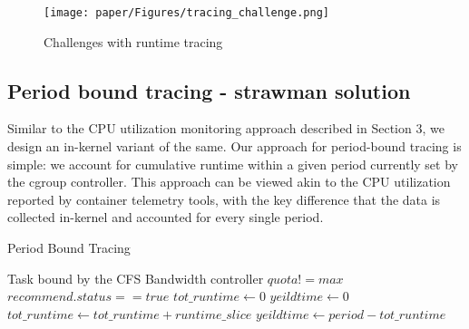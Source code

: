 
\begin{figure}[h]
\centering
\texttt{[image: paper/Figures/tracing\_challenge.png]}
\caption{Challenges with runtime tracing}
\label{fig:challenge}
\end{figure}



\subsection{Period bound tracing - strawman solution}
Similar to the CPU utilization monitoring approach described in Section 3, we design an in-kernel variant of the same. Our approach for period-bound tracing is simple: we account for cumulative runtime within a given period currently set by the cgroup controller. This approach can be viewed akin to the CPU utilization reported by container telemetry tools, with the key difference that the data is collected in-kernel and accounted for every single period. 

\begin{algorithm}
\caption{Period Bound Tracing}\label{alg:pbt}
\begin{algorithmic}
\Require Task bound by the CFS Bandwidth controller
\Require $quota != max$
\Require $recommend.status == true$
\State $tot\_runtime \gets 0$
\State $yeildtime \gets 0$
    \State $tot\_runtime \gets tot\_runtime + runtime\_slice $
\EndIf
\EndWhile
\State $yeildtime \gets period - tot\_runtime$
\end{algorithmic}
\end{algorithm}


